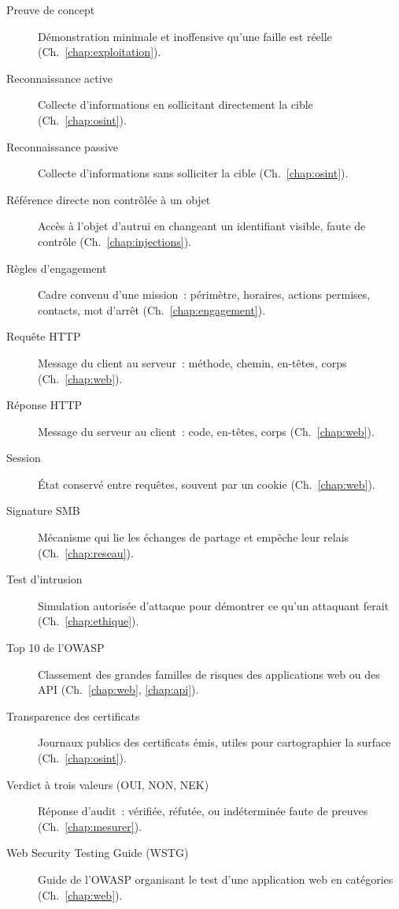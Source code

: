 \begin{description}
    \item[Preuve de concept] Démonstration minimale et inoffensive qu'une faille est réelle (Ch.~\ref{chap:exploitation}).
    \item[Reconnaissance active] Collecte d'informations en sollicitant directement la cible (Ch.~\ref{chap:osint}).
    \item[Reconnaissance passive] Collecte d'informations sans solliciter la cible (Ch.~\ref{chap:osint}).
    \item[Référence directe non contrôlée à un objet] Accès à l'objet d'autrui en changeant un identifiant visible, faute de contrôle (Ch.~\ref{chap:injections}).
    \item[Règles d'engagement] Cadre convenu d'une mission~: périmètre, horaires, actions permises, contacts, mot d'arrêt (Ch.~\ref{chap:engagement}).
    \item[Requête HTTP] Message du client au serveur~: méthode, chemin, en-têtes, corps (Ch.~\ref{chap:web}).
    \item[Réponse HTTP] Message du serveur au client~: code, en-têtes, corps (Ch.~\ref{chap:web}).
    \item[Session] État conservé entre requêtes, souvent par un cookie (Ch.~\ref{chap:web}).
    \item[Signature SMB] Mécanisme qui lie les échanges de partage et empêche leur relais (Ch.~\ref{chap:reseau}).
    \item[Test d'intrusion] Simulation autorisée d'attaque pour démontrer ce qu'un attaquant ferait (Ch.~\ref{chap:ethique}).
    \item[Top 10 de l'OWASP] Classement des grandes familles de risques des applications web ou des API (Ch.~\ref{chap:web}, \ref{chap:api}).
    \item[Transparence des certificats] Journaux publics des certificats émis, utiles pour cartographier la surface (Ch.~\ref{chap:osint}).
    \item[Verdict à trois valeurs (OUI, NON, NEK)] Réponse d'audit~: vérifiée, réfutée, ou indéterminée faute de preuves (Ch.~\ref{chap:mesurer}).
    \item[Web Security Testing Guide (WSTG)] Guide de l'OWASP organisant le test d'une application web en catégories (Ch.~\ref{chap:web}).
\end{description}

